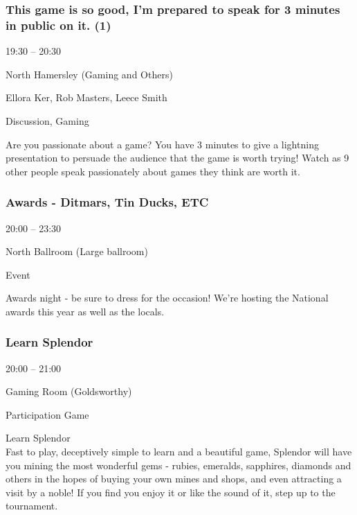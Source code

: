 \documentclass{scrreprt}
\begin{document}
\begin{multicols}{2}
\subsubsection*{This game is so good, I'm prepared to speak for 3 minutes in public on it. (1)}\begin{description}
\setlength{\itemsep}{0pt}
\setlength{\parsep}{0pt}
\setlength{\parskip}{0pt}
\item[Time:]{19:30 -- 20:30}
\item[Venue:]{North Hamersley (Gaming and Others)}
\item[People:]{Ellora Ker, Rob Masters, Leece Smith}
\item[Tags:]{Discussion, Gaming}\end{description}
Are you passionate about a game? You have 3 minutes to give a lightning presentation to persuade the audience that the game is worth trying! Watch as 9 other people speak passionately about games they think are worth it.
\subsubsection*{Awards - Ditmars, Tin Ducks, ETC}\begin{description}
\setlength{\itemsep}{0pt}
\setlength{\parsep}{0pt}
\setlength{\parskip}{0pt}
\item[Time:]{20:00 -- 23:30}
\item[Venue:]{North Ballroom (Large ballroom)}
\item[Tags:]{Event}\end{description}
Awards night - be sure to dress for the occasion! We're hosting the National awards this year as well as the locals.
\subsubsection*{Learn Splendor}\begin{description}
\setlength{\itemsep}{0pt}
\setlength{\parsep}{0pt}
\setlength{\parskip}{0pt}
\item[Time:]{20:00 -- 21:00}
\item[Venue:]{Gaming Room (Goldsworthy)}
\item[Tags:]{Participation Game}\end{description}
Learn Splendor\\Fast to play, deceptively simple to learn and a beautiful game, Splendor will have you mining the most wonderful gems - rubies, emeralds, sapphires, diamonds and others in the hopes of buying your own mines and shops, and even attracting a visit by a noble! If you find you enjoy it or like the sound of it, step up to the tournament.

\end{multicols}
\end{document}

